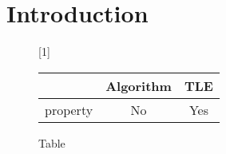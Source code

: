 \section{Introduction}
\label{sec:intro}
%
\begin{figure*}[!ht]
      
     \scalebox{1}[1]{
     \begin{tabularx}{\textwidth}{c|c|c}
	~~~~~ & Algorithm & TLE\\ \hline
	property & No & Yes \\ \hline
   \end{tabularx}
\caption{Table}\label{fig:main}    
}
\end{figure*}
